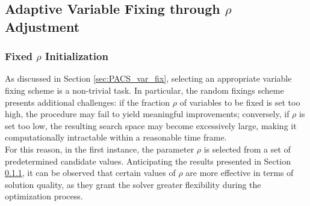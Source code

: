 \subsection{Adaptive Variable Fixing through $\rho$ Adjustment}\label{sec:dyn_var_fix}
\subsubsection{Fixed $\rho$ Initialization}
As discussed in Section \ref{sec:PACS_var_fix}, selecting an appropriate variable fixing scheme is a non-trivial task. In particular, the random fixings scheme presents additional challenges: if the fraction $\rho$ of variables to be fixed is set too high, the procedure may fail to yield meaningful improvements; conversely, if $\rho$ is set too low, the resulting search space may become excessively large, making it computationally intractable within a reasonable time frame. \\
For this reason, in the first instance, the parameter $\rho$ is selected from a set of predetermined candidate values. Anticipating the results presented in Section \ref{}, it can be observed that certain values of $\rho$ are more effective in terms of solution quality, as they grant the solver greater flexibility during the optimization process.
